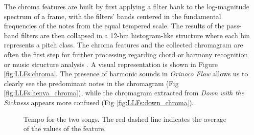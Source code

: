 The chroma features are built by first applying a filter bank to the log-magnitude spectrum of a frame, with the filters' bands centered in the fundamental frequencies of the notes from the equal tempered scale. The results of the pass-band filters are then collapsed in a 12-bin histogram-like structure where each bin represents a pitch class. The chroma features and the collected chromagram are often the first step for further processing regarding chord or harmony recognition or music structure analysis \cite{Nieto2D, Digiorgi2013}. A visual representation is shown in Figure \ref{fig:LLFs:chroma}. The presence of harmonic sounds in \textit{Orinoco Flow} allows us to clearly see the predominant notes in the chromagram (Fig \ref{fig:LLFs:henya_chroma}), while the chromagram extracted from \textit{Down with the Sickness} appears more confused (Fig \ref{fig:LLFs:down_chroma}).

\begin{figure}[tb]
	\centering
	 \hfil
	\caption{Tempo for the two songs. The red dashed line indicates the average of the values of the feature.}
	\label{fig:LLFs:tempo}          
\end{figure}

